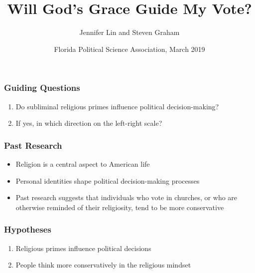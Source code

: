 \documentclass[14pt]{beamer}
\begin{document}
\author[Lin, J., and Graham, S.] %
{Jennifer Lin and Steven Graham}
	\title{Will God’s Grace Guide My Vote?}
		
	\date[FPSA 2019]{Florida Political Science Association, March 2019}
	\begin{frame}[plain]
	\maketitle
\end{frame}

\begin{frame}
\frametitle{Guiding Questions}
\begin{enumerate}
	\item Do subliminal religious primes influence political decision-making?
	\item If yes, in which direction on the left-right scale?
\end{enumerate}
\end{frame}

\begin{frame}
\frametitle{Past Research}
\begin{itemize}
	\item Religion is a central aspect to American life
	\item Personal identities shape political decision-making processes
	\item Past research suggests that individuals who vote in churches, or who are otherwise reminded of their religiosity, tend to be more conservative
\end{itemize}
\end{frame}

\begin{frame}
\frametitle{Hypotheses}
\begin{enumerate}
	\item Religious primes influence political decisions
	\item People think more conservatively in the religious mindset
\end{enumerate}
\end{frame}
\end{document}
